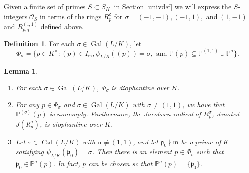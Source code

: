 \documentclass[12pt,reqno]{amsart}
\newcommand{\mm}{\mathfrak{m}}
\newcommand{\OO}{\mathcal{O}}
\newcommand{\pp}{\mathfrak{p}}
\newcommand{\PP}{\mathbb{P}}
\DeclareMathOperator{\Gal}{Gal}
\newtheorem{lem}[thm]{Lemma}
\theoremstyle{definition}
\newtheorem{defn}[thm]{Definition}
\begin{document}
Given a finite set of primes $S\subset S_K$, in Section \ref{univdef}
we will express the $S$-integers $\OO_S$ in terms of the rings
$R_p^{\sigma}$ for $\sigma=(-1,-1),(-1,1),$ and $(1,-1)$ and
$R_{p,q}^{(1,1)}$ defined above.

\begin{defn} For each $\sigma \in \Gal(L/K)$, let 
\[
\Phi_{\sigma}=\{p\in K^{\times}: (p)\in I_{\mm}, \psi_{L/K}((p))=\sigma,\text{ and }\PP(p)\subseteq \PP^{(1,1)}\cup \PP^{\sigma}\}.
\]
\end{defn}
\begin{lem}\label{not1,1}
$\left.\right.$
\begin{enumerate}
\item For each $\sigma\in \Gal(L/K)$, $\Phi_{\sigma}$ is diophantine over  $K$. 
\item For any $p\in \Phi_{\sigma}$ and $\sigma\in
  \Gal(L/K)$ with $\sigma\not=(1,1)$, we have that
  $\PP^{(\sigma)}(p)$ is nonempty. Furthermore, the Jacobson radical
  of $R_p^{\sigma}$, denoted $J(R_p^{\sigma})$, is diophantine over
  $K$.
\item Let $\sigma\in \Gal(L/K)$ with
  $\sigma\not=(1,1)$, and let $\pp_0\nmid \mm$ be a prime of $K$
  satisfying $\psi_{L/K}(\pp_0)=\sigma$. Then there is an element
  $p\in \Phi_{\sigma}$ such that $\pp_0\in \PP^{\sigma}(p)$. In fact,
  $p$ can be chosen so that $\PP^{\sigma}(p)=\{\pp_0\}$.
\end{enumerate}
\end{lem}
\end{document}
